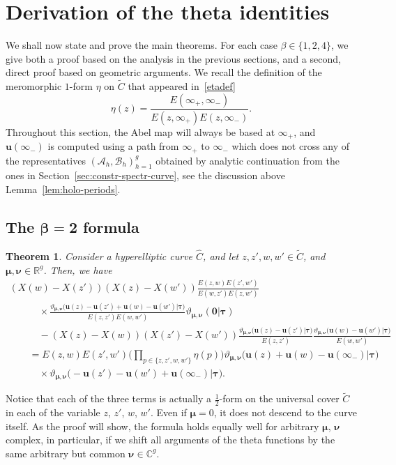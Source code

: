 \documentclass[pdftex]{sigma}
\numberwithin{equation}{section}
\newtheorem{Theorem}{Theorem}[section]
\begin{document}
\section{Derivation of the theta identities}
\label{sec:derivation-formulae}

We shall now state and prove the main theorems. For each case
$\beta \in \{1,2,4\}$, we give both a proof based on the
analysis in the previous sections, and a second, direct proof based on geometric arguments. We recall the definition of the meromorphic $1$-form $\eta$ on $\widetilde{C}$ that appeared in~\eqref{etadef}
\[
\eta(z) = \frac{E(\infty_+,\infty_-)}{E(z,\infty_+)E(z,\infty_-)}.
\]
Throughout this section, the Abel map will always be based at $\infty_+$, and $\bm{u}(\infty_-)$ is computed using a path from $\infty_+$ to $\infty_-$ which does not cross any of the representatives $(\mathcal{A}_h,\mathcal{B}_h)_{h = 1}^{g}$ obtained by analytic continuation from the ones in Section~\ref{sec:constr-spectr-curve}, see the discussion above Lemma~\ref{lem:holo-periods}.

\subsection[The beta = 2 formula]{The $\boldsymbol{\beta = 2}$ formula}

\begin{Theorem}\label{thm:formula_beta_2}
 Consider a hyperelliptic curve $\widehat{C}$, and let
 $z,z',w,w' \in \widetilde{C}$, and
 $\bm{\mu}, \bm{\nu} \in \mathbb{R}^g$. Then, we have
 \begin{gather}
  (X(w) - X(z'))(X(z) - X(w'))\frac{E(z,w)E(z',w')}{E(w,z')E(z,w')}\nonumber\\
  \qquad \quad{}\times\frac{\vartheta_{\bm{\mu},\bm{\nu}}\bigl(\bm{u}(z) - \bm{u}(z') + \bm{u}(w) - \bm{u}(w')\big|\bm{\tau}\bigr)}{E(z,z')E(w,w')}\vartheta_{\bm{\mu}, \bm{\nu}}(\bm{0}\big|\bm{\tau}) \nonumber\\
  \qquad\quad {}-(X(z) - X(w))(X(z') - X(w'))\frac{\vartheta_{\bm{\mu},\bm{\nu}}(\bm{u}(z) - \bm{u}(z')\big|\bm{\tau}\bigr)}{E(z,z')}\frac{\vartheta_{\bm{\mu},\bm{\nu}}\bigl(\bm{u}(w) - \bm{u}(w')\big|\bm{\tau}\bigr)}{E(w,w')}\nonumber\\
  \qquad {}= E(z,w)E(z',w') \biggr( \prod_{p \in \{z, z', w, w'\}} \eta(p)\biggr)\vartheta_{\bm{\mu},\bm{\nu}}\bigl(\bm{u}(z) + \bm{u}(w) -\bm{u}(\infty_-)\big|\bm{\tau}\bigr)\nonumber\\
  \qquad \quad{}\times\vartheta_{\bm{\mu},\bm{\nu}}\bigl(- \bm{u}(z') - \bm{u}(w') + \bm{u}(\infty_-)\big|\bm{\tau}\bigr).\label{eq:formula-beta-2}
 \end{gather}
\end{Theorem}
Notice that each of the three terms is actually a $\frac{1}{2}$-form on the universal cover $\widetilde{C}$ in each of the variable $z$, $z'$, $w$, $w'$. Even if $\bm{\mu} = 0$, it does not descend to the curve itself. As the proof will show, the formula holds equally well for arbitrary $\bm{\mu}$, $\bm{\nu}$ complex, in particular, if we shift all arguments of the theta functions by the same arbitrary but common $\bm{\nu} \in \mathbb{C}^g$.
\end{document}
